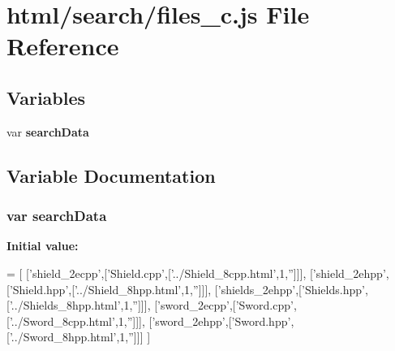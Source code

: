 \section{html/search/files\-\_\-c.js File Reference}
\label{files__c_8js}
\subsection*{Variables}
\begin{DoxyCompactItemize}
\item 
var {\bf search\-Data}
\end{DoxyCompactItemize}


\subsection{Variable Documentation}
\subsubsection[{search\-Data}]{\setlength{\rightskip}{0pt plus 5cm}var search\-Data}\label{files__c_8js_ad01a7523f103d6242ef9b0451861231e}
{\bfseries Initial value\-:}
\begin{DoxyCode}
=
[
  [\textcolor{stringliteral}{'shield\_2ecpp'},[\textcolor{stringliteral}{'Shield.cpp'},[\textcolor{stringliteral}{'../Shield\_8cpp.html'},1,\textcolor{stringliteral}{''}]]],
  [\textcolor{stringliteral}{'shield\_2ehpp'},[\textcolor{stringliteral}{'Shield.hpp'},[\textcolor{stringliteral}{'../Shield\_8hpp.html'},1,\textcolor{stringliteral}{''}]]],
  [\textcolor{stringliteral}{'shields\_2ehpp'},[\textcolor{stringliteral}{'Shields.hpp'},[\textcolor{stringliteral}{'../Shields\_8hpp.html'},1,\textcolor{stringliteral}{''}]]],
  [\textcolor{stringliteral}{'sword\_2ecpp'},[\textcolor{stringliteral}{'Sword.cpp'},[\textcolor{stringliteral}{'../Sword\_8cpp.html'},1,\textcolor{stringliteral}{''}]]],
  [\textcolor{stringliteral}{'sword\_2ehpp'},[\textcolor{stringliteral}{'Sword.hpp'},[\textcolor{stringliteral}{'../Sword\_8hpp.html'},1,\textcolor{stringliteral}{''}]]]
]
\end{DoxyCode}
